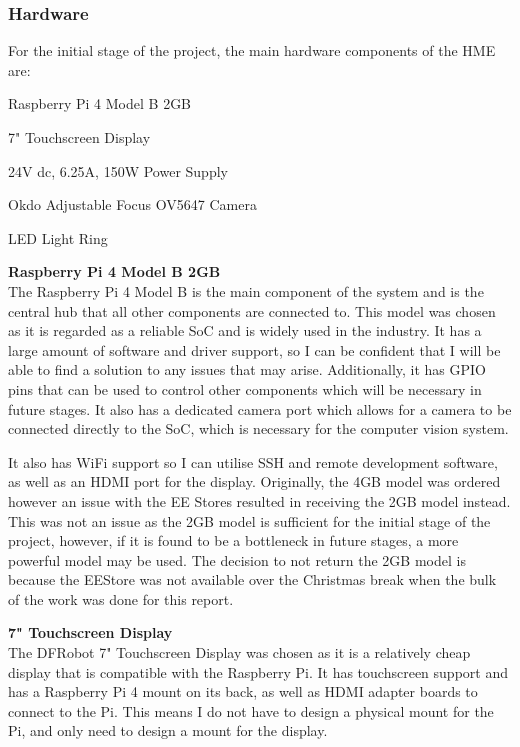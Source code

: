 \subsubsection{Hardware} \label{sec:hardware}
For the initial stage of the project, the main hardware components of the HME are:
\begin{mylist}
  \item Raspberry Pi 4 Model B 2GB\cite{pi4}
  \item 7" Touchscreen Display\cite{7inchdisplay}
  \item 24V dc, 6.25A, 150W Power Supply
  \item Okdo Adjustable Focus OV5647 Camera\cite{okdocamera}
  \item LED Light Ring
\end{mylist}
\textbf{Raspberry Pi 4 Model B 2GB} \\
The Raspberry Pi 4 Model B is the main component of the system and is the central hub that all other components are connected to.
This model was chosen as it is regarded as a reliable SoC and is widely used in the industry. It has a large amount of software
and driver support, so I can be confident that I will be able to find a solution to any issues that may arise. Additionally, 
it has GPIO pins that can be used to control other components which will be necessary in future stages. It also has a 
dedicated camera port which allows for a camera to be connected directly to the SoC, which is necessary for the computer vision system.

It also has WiFi support so I can utilise SSH and remote development software, as well as an HDMI port for the display.
Originally, the 4GB model was ordered however an issue with the EE Stores resulted in receiving the 2GB model instead.
This was not an issue as the 2GB model is sufficient for the initial stage of the project, however, if it is found to be a bottleneck
in future stages, a more powerful model may be used. The decision to not return the 2GB model is because the EEStore was not
available over the Christmas break when the bulk of the work was done for this report.

\vspace{1em}
\noindent
\textbf{7" Touchscreen Display} \\
The DFRobot 7" Touchscreen Display was chosen as it is a relatively cheap display that is compatible with the Raspberry Pi.
It has touchscreen support and has a Raspberry Pi 4 mount on its back, as well as HDMI adapter boards to connect to the Pi.
This means I do not have to design a physical mount for the Pi, and only need to design a mount for the display.

